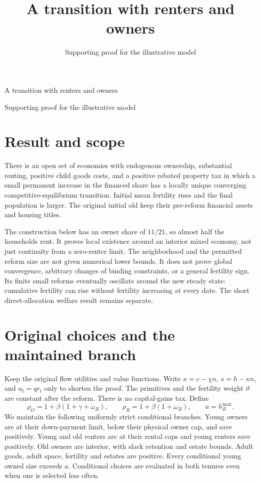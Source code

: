 \documentclass[
  11pt,
]{article}
\title{A transition with renters and owners}
\subtitle{Supporting proof for the illustrative model}
\author{}
\date{}
\begin{document}
\begin{center}
{\Large A transition with renters and owners}\par
\smallskip
{\small Supporting proof for the illustrative model}
\end{center}

\section{Result and scope}\label{result-and-scope}

There is an open set of economies with endogenous ownership, substantial
renting, positive child goods costs, and a positive rebated property tax
in which a small permanent increase in the financed share has a locally
unique converging competitive-equilibrium transition. Initial mean
fertility rises and the final population is larger. The original initial
old keep their pre-reform financial assets and housing titles.

The construction below has an owner share of \(11/21\), so almost half
the households rent. It proves local existence around an interior mixed
economy, not just continuity from a zero-renter limit. The neighborhood
and the permitted reform size are not given numerical lower bounds. It
does not prove global convergence, arbitrary changes of binding
constraints, or a general fertility sign. Its finite small reforms
eventually oscillate around the new steady state: cumulative fertility
can rise without fertility increasing at every date. The short
direct-allocation welfare result remains separate.

\section{Original choices and the maintained
branch}\label{original-choices-and-the-maintained-branch}

Keep the original flow utilities and value functions. Write
\(x=c-\chi n\), \(s=h-\kappa n\), and \(u_t=qr_t\) only to shorten the
proof. The primitives and the fertility weight \(\vartheta\) are
constant after the reform. There is no capital-gains tax. Define \[
 \rho_O=1+\beta(1+\gamma+\omega_B),\qquad
 \rho_R=1+\beta(1+\omega_B),\qquad a=h_R^{\max}.
\] We maintain the following uniformly strict conditional branches.
Young owners are at their down-payment limit, below their physical owner
cap, and save positively. Young and old renters are at their rental caps
and young renters save positively. Old owners are interior, with slack
retention and estate bounds. Adult goods, adult space, fertility and
estates are positive. Every conditional young owned size exceeds \(a\).
Conditional choices are evaluated in both tenures even when one is
selected less often.
\end{document}
